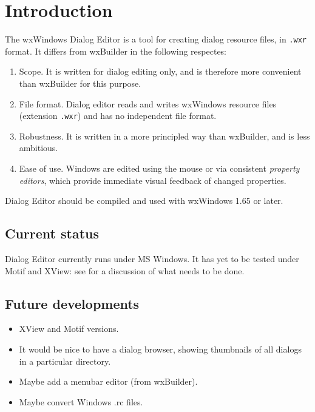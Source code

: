 \chapter{Introduction}\label{introduction}
%
%
\setfooter{\thepage}{}{}{}{}{\thepage}%

The wxWindows Dialog Editor is a tool for creating dialog resource files, in {\tt .wxr} format.
It differs from wxBuilder in the following respectes:

\begin{enumerate}\itemsep=0pt
\item Scope. It is written for dialog editing only, and is therefore more convenient than wxBuilder for this purpose.
\item File format. Dialog editor reads and writes wxWindows resource files (extension {\tt .wxr}) and has
no independent file format.
\item Robustness. It is written in a more principled way than wxBuilder, and is less ambitious.
\item Ease of use. Windows are edited using the mouse or via consistent {\it property editors}, which
provide immediate visual feedback of changed properties.
\end{enumerate}

Dialog Editor should be compiled and used with wxWindows 1.65 or later.

\section{Current status}

Dialog Editor currently runs under MS Windows. It has yet to
be tested under Motif and XView: see  for a discussion
of what needs to be done.

\section{Future developments}

\begin{itemize}\itemsep=0pt
\item XView and Motif versions.
\item It would be nice to have a dialog browser, showing thumbnails of
all dialogs in a particular directory.
\item Maybe add a menubar editor (from wxBuilder).
\item Maybe convert Windows .rc files.
\end{itemize}

